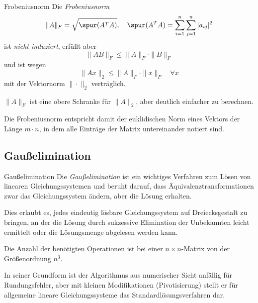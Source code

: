 \begin{defi}{Frobeniusnorm}
    Die \emph{Frobeniusnorm}
    \[
        \| A \|_F = \sqrt{\spur(A^TA)}, \quad \spur(A^TA) = \sum_{i=1}^{n} \sum_{j=1}^{n} |a_{ij}|^2
    \]
    ist \emph{nicht induziert}, erfüllt aber
    \[
        \| AB \|_F \leq \| A \|_F \cdot \| B \|_F
    \]
    und ist wegen
    \[
        \| Ax \|_2 \leq \| A \|_F \cdot \| x \|_F \quad \forall x
    \]
    mit der Vektornorm $\| \cdot \|_2$ verträglich.

    $\| A \|_F$ ist eine obere Schranke für $\| A \|_2$, aber deutlich einfacher zu berechnen.

    Die Frobeniusnorm entspricht damit der euklidischen Norm eines Vektors der Länge $m \cdot n$, in dem alle Einträge der Matrix untereinander notiert sind.
\end{defi}

\subsection{Gaußelimination}

\begin{defi}{Gaußelimination}
    Die \emph{Gaußelimination} ist ein wichtiges Verfahren zum Lösen von linearen Gleichungssystemen und beruht darauf, dass Äquivalenztransformationen zwar das Gleichungssystem ändern, aber die Lösung erhalten.

    Dies erlaubt es, jedes eindeutig lösbare Gleichungssystem auf Dreiecksgestalt zu bringen, an der die Lösung durch sukzessive Elimination der Unbekannten leicht ermittelt oder die Lösungsmenge abgelesen werden kann.

    Die Anzahl der benötigten Operationen ist bei einer $n \times n$-Matrix von der Größenordnung $n^3$.

    In seiner Grundform ist der Algorithmus aus numerischer Sicht anfällig für Rundungsfehler, aber mit kleinen Modifikationen (Pivotisierung) stellt er für allgemeine lineare Gleichungssysteme das Standardlösungsverfahren dar.
\end{defi}


